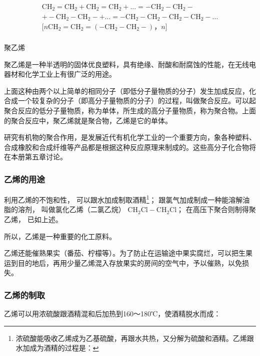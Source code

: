 \[
\begin{array}{l} \mathrm{CH} _ {2} = \mathrm{CH} _ {2} + \mathrm{CH} _ {2} = \mathrm{CH} _ {2} + \dots = - \mathrm{CH} _ {2} - \mathrm{CH} _ {2} - \\ + - \mathrm{CH} _ {2} - \mathrm{CH} _ {2} - + \dots = - \mathrm{CH} _ {2} - \mathrm{CH} _ {2} - \mathrm{CH} _ {2} - \mathrm{CH} _ {2} - \dots \\ {[} n \mathrm{CH}_{2} = \mathrm{CH}_{2} = (-\mathrm{CH}_{2}-\mathrm{CH}_{2}-)\text{，} n {]} \\ \end{array}
\]

聚乙烯

聚乙烯是一种半透明的固体优良塑料，具有绝缘、耐酸和耐腐蚀的性能，在无线电器材和化学工业上有很广泛的用途。

上面这种由两个以上简单的相同分子（即低分子量物质的分子）发生加成反应，化合成一个较复杂的分子（即高分子量物质的分子）的过程，叫做聚合反应。可以起聚合反应的低分子量物质，称为单体，所生成的高分子量物质，称为聚合物。上面的聚合反应中，聚乙烯就是聚合物，乙烯是它的单体。

研究有机物的聚合作用，是发展近代有机化学工业的一个重要方向，象各种塑料、合成橡胶和合成纤维等产品都是根据这种反应原理来制成的。这些高分子化合物将在本册第五章讨论。

\subsubsection{乙烯的用途}

利用乙烯的不饱和性， 可以跟水加成制取酒精\footnote{浓硫酸能吸收乙烯成为乙基硫酸，再跟水共热，又分解为硫酸和酒精。乙烯跟水加成为酒精的过程是：}；
跟氯气加成制成一种能溶解油脂的溶剂， 叫做氯化乙烯（二氯乙烷）
\(\mathrm{CH}_{2} \mathrm{Cl}-\mathrm{CH}_{2} \mathrm{Cl}\)；
在高压下聚合则制得聚乙烯， 已如上述。

所以，乙烯是一种重要的化工原料。

乙烯还能催熟果实（番茄、柠檬等）。为了防止在运输途中果实腐烂，可以把生果运到目的地后，再用少量乙烯混入存放果实的房间的空气中，予以催熟，以免损失。

\subsubsection{乙烯的制取}

乙烯可以用浓硫酸跟酒精混和后加热到160～180℃，使酒精脱水而成：

